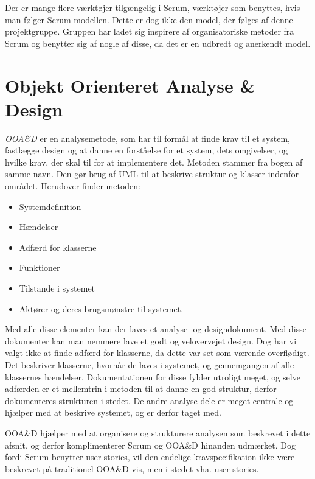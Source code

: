 Der er mange flere værktøjer tilgængelig i Scrum, værktøjer som benyttes, hvis man følger Scrum modellen.
Dette er dog ikke den model, der følges af denne projektgruppe.
Gruppen har ladet sig inspirere af organisatoriske metoder fra Scrum og benytter sig af nogle af disse, da det er en udbredt og anerkendt model.
\newpage
\section{Objekt Orienteret Analyse \& Design}
\textit{OOA\&D} er en analysemetode, som har til formål at finde krav til et system, fastlægge design og at danne en forståelse for et system, dets omgivelser, og hvilke krav, der skal til for at implementere det.
Metoden stammer fra bogen af samme navn.\citep{OOA&D2001}
Den gør brug af UML til at beskrive struktur og klasser indenfor området.
Herudover finder metoden:

\begin{itemize}[nolistsep,noitemsep]
\item Systemdefinition
\item Hændelser
\item Adfærd for klasserne
\item Funktioner
\item Tilstande i systemet
\item Aktører og deres brugsmønstre til systemet.
\end{itemize}

Med alle disse elementer kan der laves et analyse- og designdokument.
Med disse dokumenter kan man nemmere lave et godt og velovervejet design.
Dog har vi valgt ikke at finde adfærd for klasserne, da dette var set som værende overflødigt.
Det beskriver klasserne, hvornår de laves i systemet, og gennemgangen af alle klassernes hændelser. 
Dokumentationen for disse fylder utroligt meget, og selve adfærden er et mellemtrin i metoden til at danne en god struktur, derfor dokumenteres strukturen i stedet.
De andre analyse dele er meget centrale og hjælper med at beskrive systemet, og er derfor taget med. 


OOA\&D hjælper med at organisere og strukturere analysen som beskrevet i dette afsnit, og derfor komplimenterer Scrum og OOA\&D hinanden udmærket.
Dog fordi Scrum benytter user stories, vil den endelige kravspecifikation ikke være beskrevet på traditionel OOA\&D vis, men i stedet vha. user stories.









